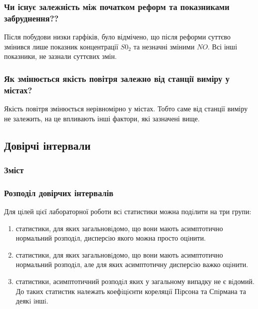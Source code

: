 \documentclass{beamer}
\begin{document}
\begin{frame}
  \frametitle{Чи існує залежність між початком реформ та показниками забруднення??}

  Після побудови низки гарфіків, було відмічено, що після реформи суттєво змінився 
  лише показник концентрації $S0_2$ та незначні зміними $NO$. Всі інші показники, не зазнали суттєвих змін.
  
\end{frame}

\begin{frame}
  \frametitle{Як змінюється якість повітря залежно від станції виміру у містах?}

  Якість повітря змінюється нерівномірно у містах. Тобто саме від станції виміру не залежить, 
    на це впливають інші фактори, які зазначені вище.

\end{frame}


\begin{frame}
  \section{Довірчі інтервали}

  \frametitle{Зміст}
  \tableofcontents[currentsection]
\end{frame}

\begin{frame}
  \frametitle{Розподіл довірчих інтервалів}
  Для цiлей цiєї лабораторної роботи всi статистики можна подiлити на три групи:
  \begin{enumerate}
    \renewcommand{\theenumi}{\Roman{enumi}}
    \item  статистики, для яких загальновiдомо, що вони мають асимптотично нормальний розподiл,
    дисперсiю якого можна просто оцiнити. 
     
    \item статистики, для яких загальновiдомо, що вони мають асимптотично нормальний розподiл, але для
    яких асимптотичну дисперсiю важко оцiнити. 

    \item  статистики, асимптотичний розподiл яких у загальному випадку не є вiдомий. До таких статистик
    належать коефiцiєнти кореляцiї Пiрсона та Спiрмана та деякi iншi.
  \end{enumerate}
\end{frame} 
\end{document}
